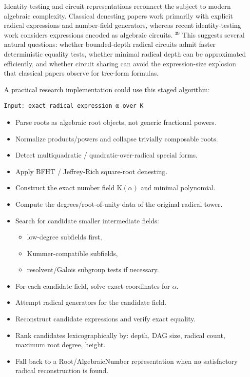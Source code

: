 \documentclass[10pt]{article}
\begin{document}
Identity testing and circuit representations reconnect the subject to modern algebraic complexity. Classical denesting papers work primarily with explicit radical expressions and number-field generators, whereas recent identity-testing work considers expressions encoded as algebraic circuits. ${ }^{39}$ This suggests several natural questions: whether bounded-depth radical circuits admit faster deterministic equality tests, whether minimal radical depth can be approximated efficiently, and whether circuit sharing can avoid the expression-size explosion that classical papers observe for tree-form formulas.

A practical research implementation could use this staged algorithm:

\begin{verbatim}
Input: exact radical expression α over K
\end{verbatim}

\begin{itemize}
  \item[1.] Parse roots as algebraic root objects, not generic fractional powers.
  \item[2.] Normalize products/powers and collapse trivially composable roots.
\end{itemize}

\begin{itemize}
  \item[3.] Detect multiquadratic / quadratic-over-radical special forms.
  \item[4.] Apply BFHT / Jeffrey-Rich square-root denesting.
  \item[5.] Construct the exact number field $\mathrm{K}(\alpha)$ and minimal polynomial.
  \item[6.] Compute the degrees/root-of-unity data of the original radical tower.
  \item[7.] Search for candidate smaller intermediate fields:
  \begin{itemize}
    \item[a.] low-degree subfields first,
    \item[b.] Kummer-compatible subfields,
    \item[c.] resolvent/Galois subgroup tests if necessary.
  \end{itemize}
  \item[8.] For each candidate field, solve exact coordinates for $\alpha$.
  \item[9.] Attempt radical generators for the candidate field.
  \item[10.] Reconstruct candidate expressions and verify exact equality.
  \item[11.] Rank candidates lexicographically by: depth, DAG size, radical count, maximum root degree, height.
  \item[12.] Fall back to a Root/AlgebraicNumber representation when no satisfactory radical reconstruction is found.
\end{itemize}
\end{document}

